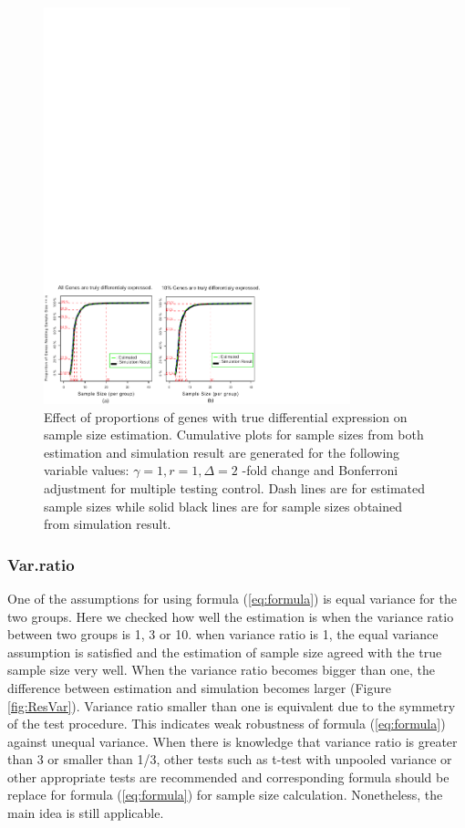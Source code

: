 \documentclass{bioinfo}
\begin{document}
\begin{figure}[h]
  \centerline{\includegraphics*[width=3.5in]{ResAlt.pdf}}
  \caption[Effect of proportions of genes with true differential expression on sample size estimation]
  {Effect of proportions of genes with true differential expression on sample size estimation.
    Cumulative plots for sample sizes from both estimation and simulation result
    are generated for the following variable values: $\gamma = 1, r = 1, \Delta = 2$ -fold change
    and Bonferroni adjustment for multiple testing control. Dash lines are for estimated sample sizes
    while solid black lines are for sample sizes obtained from simulation result.}
  \label{fig:ResAlt}
\end{figure}

\subsubsection{Var.ratio}

One of the assumptions for using formula (\ref{eq:formula}) is
equal variance for the two groups. Here we checked how well the
estimation is when the variance ratio between two groups is 1, 3
or 10. when variance ratio is 1, the equal variance assumption is
satisfied and the estimation of sample size agreed with the true
sample size very well. When the variance ratio becomes bigger than
one, the difference between estimation and simulation becomes
larger (Figure \ref{fig:ResVar}). Variance ratio smaller than one
is equivalent due to the symmetry of the test procedure. This
indicates weak robustness of  formula (\ref{eq:formula}) against
unequal variance. When there is knowledge that variance ratio is
greater than 3 or smaller than 1/3, other tests such as t-test
with unpooled variance or other appropriate tests are recommended
and corresponding formula should be replace for formula
(\ref{eq:formula}) for sample size calculation. Nonetheless, the
main idea is still applicable.
\end{document}
